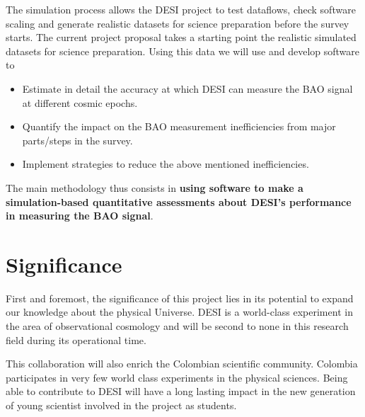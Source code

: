 \documentclass[12pt]{article}
\begin{document}
The simulation process allows the DESI project to test dataflows, check software
scaling  and generate realistic datasets for science preparation before
the survey starts. The current project proposal takes a starting point the
realistic simulated datasets for science preparation. Using this data we will
use and develop software to  
\begin{itemize}
\item Estimate in detail the accuracy at which DESI can measure the
  BAO signal at different cosmic epochs.
\item Quantify the impact on the BAO measurement inefficiencies from
  major parts/steps in the survey. 
\item Implement strategies to reduce the above mentioned inefficiencies. 
\end{itemize}

The main methodology thus consists in {\bf using software to make a
simulation-based quantitative assessments about DESI's performance in
measuring the BAO signal}. 

\section*{Significance}

First and foremost, the significance of this project lies in its
potential to expand our knowledge about the physical Universe. DESI is
a world-class experiment in the area of observational cosmology and
will be second to none in this research field during its operational
time.  
 

This collaboration will also enrich the Colombian scientific
community. Colombia participates in very few world class experiments
in the physical sciences. Being able to contribute to DESI will have a
long lasting impact in the new generation of young scientist involved
in the project as students.  
\end{document}
